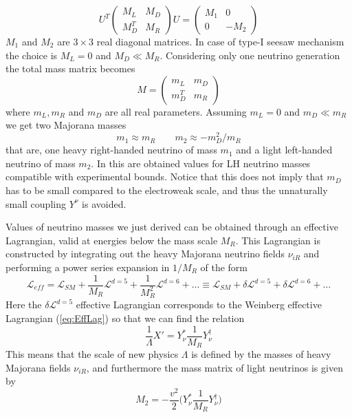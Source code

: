 \documentclass{subnucbo}
\begin{document}
\begin{equation}
U^T\begin{pmatrix}M_L & M_D\\ M_D^T & M_R\end{pmatrix}U=\begin{pmatrix}M_1 & 0 \\ 0 & -M_2\end{pmatrix}
\end{equation}
$M_1$ and $M_2$ are $3\times3$ real diagonal matrices. In case of type-I seesaw mechanism the choice is $M_L=0$ and $M_D\ll M_R$.
Considering only one neutrino generation the total mass matrix becomes 
\begin{equation}
M=\begin{pmatrix}m_L & m_D\\ m_D^T & m_R\end{pmatrix}
\end{equation}
where $m_L, m_R$ and $m_D$ are all real parameters. Assuming $m_L=0$ and $m_D\ll m_R$ we get two Majorana masses %
\begin{equation}
m_1\approx m_R \qquad m_2\approx -m^2_D/m_R
\end{equation}
that are, one heavy right-handed neutrino of mass $m_1$ and a light left-handed neutrino of mass $m_2$. In this are obtained values for LH neutrino masses compatible with experimental bounds. Notice that this does not imply that $m_D$ has to be small compared to the electroweak scale, and thus the unnaturally small coupling $Y^{\nu}$ is avoided.

Values of neutrino masses we just derived can be obtained through an effective Lagrangian, valid at energies below the mass scale $M_R$. This Lagrangian is constructed by integrating out the heavy Majorana neutrino fields $\nu_{iR}$ and performing a power series expansion in $1/M_R$ of the form
\begin{equation}
\mathcal{L}_{eff}=\mathcal{L}_{SM}+\frac{1}{M_R}\mathcal{L}^{d=5}+\frac{1}{M_R^2}\mathcal{L}^{d=6}+\dots
\equiv \mathcal{L}_{SM}+\delta\mathcal{L}^{d=5}+\delta\mathcal{L}^{d=6}+\dots
\end{equation}
Here the $\delta\mathcal{L}^{d=5}$ effective Lagrangian corresponds to the Weinberg effective Lagrangian (\ref{eq:EffLag}) so that we can find the relation
\begin{equation}
\frac{1}{\Lambda}X'=Y^{*}_{\nu}\frac{1}{M_R}Y_{\nu}^{\dagger} %
\end{equation}
This means that the scale of new physics $\Lambda$ is defined by the masses of heavy Majorana fields $\nu_{iR}$, and furthermore the mass matrix of light neutrinos is given by
\begin{equation}
M_2=-\frac{v^2}{2}\biggl(Y^{*}_{\nu}\frac{1}{M_R}Y_{\nu}^{\dagger}\biggr) %
\end{equation}
\end{document}
